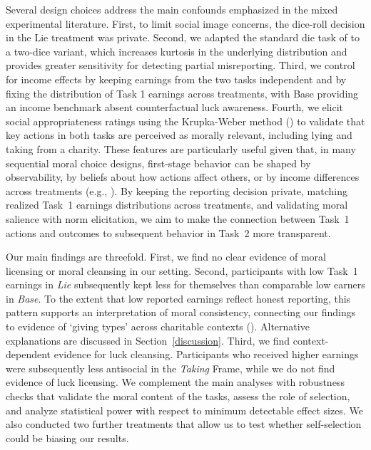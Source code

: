\documentclass{article}
\begin{document}
\par
Several design choices address the main confounds emphasized in the mixed experimental literature. First, to limit social image concerns, the dice-roll decision in the Lie treatment was private. Second, we adapted the standard die task of \textcite{Fischbacher2013} to a two-dice variant, which increases kurtosis in the underlying distribution and provides greater sensitivity for detecting partial misreporting. Third, we control for income effects by keeping earnings from the two tasks independent and by fixing the distribution of Task 1 earnings across treatments, with Base providing an income benchmark absent counterfactual luck awareness. Fourth, we elicit social appropriateness ratings using the Krupka-Weber method (\cite{Krupka2013}) to validate that key actions in both tasks are perceived as morally relevant, including lying and taking from a charity. These features are particularly useful given that, in many sequential moral choice designs, first-stage behavior can be shaped by observability, by beliefs about how actions affect others, or by income differences across treatments (e.g., \cite{Gneezy2014,Ploner2013}). By keeping the reporting decision private, matching realized Task~1 earnings distributions across treatments, and validating moral salience with norm elicitation, we aim to make the connection between Task~1 actions and outcomes to subsequent behavior in Task~2 more transparent.
\par
Our main findings are threefold. First, we find no clear evidence of moral licensing or moral cleansing in our setting. Second, participants with low Task~1 earnings in \textit{Lie} subsequently kept less for themselves than comparable low earners in \textit{Base}. To the extent that low reported earnings reflect honest reporting, this pattern supports an interpretation of moral consistency, connecting our findings to evidence of `giving types' across charitable contexts (\cite{deOliveira2011}). Alternative explanations are discussed in Section~\ref{discussion}. Third, we find context-dependent evidence for luck cleansing. Participants who received higher earnings were subsequently less antisocial in the \textit{Taking} Frame, while we do not find evidence of luck licensing. We complement the main analyses with robustness checks that validate the moral content of the tasks, assess the role of selection, and analyze statistical power with respect to minimum detectable effect sizes. We also conducted two further treatments that allow us to test whether self-selection could be biasing our results.
\end{document}
